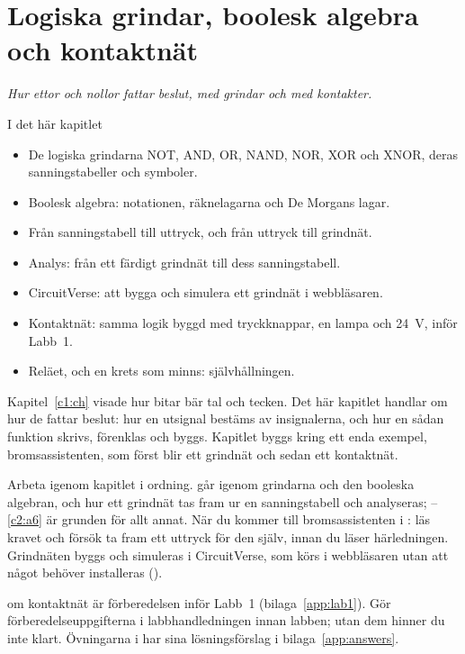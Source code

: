 
\chapter{Logiska grindar, boolesk algebra och kontaktnät}
\label{c2:ch}

{\large\itshape Hur ettor och nollor fattar beslut, med grindar och med kontakter.\par}

\begin{chapterbox}{I det här kapitlet}
\begin{itemize}
  \item De logiska grindarna NOT, AND, OR, NAND, NOR, XOR och XNOR, deras sanningstabeller och
    symboler.
  \item Boolesk algebra: notationen, räknelagarna och De Morgans lagar.
  \item Från sanningstabell till uttryck, och från uttryck till grindnät.
  \item Analys: från ett färdigt grindnät till dess sanningstabell.
  \item CircuitVerse: att bygga och simulera ett grindnät i webbläsaren.
  \item Kontaktnät: samma logik byggd med tryckknappar, en lampa och 24~V, inför Labb~1.
  \item Reläet, och en krets som minns: självhållningen.
\end{itemize}
\end{chapterbox}

Kapitel~\ref{c1:ch} visade hur bitar bär tal och tecken. Det här kapitlet handlar om hur de fattar
beslut: hur en utsignal bestäms av insignalerna, och hur en sådan funktion skrivs, förenklas och
byggs. Kapitlet byggs kring ett enda exempel, bromsassistenten, som först blir ett grindnät och
sedan ett kontaktnät.

Arbeta igenom kapitlet i ordning.  går igenom grindarna och den booleska
algebran, och hur ett grindnät tas fram ur en sanningstabell och analyseras;
--\ref{c2:a6} är grunden för allt annat. När du kommer till bromsassistenten i
: läs kravet och försök ta fram ett uttryck för den själv, innan du läser
härledningen. Grindnäten byggs och simuleras i CircuitVerse, som körs i webbläsaren utan att något
behöver installeras ().

 om kontaktnät är förberedelsen inför Labb~1 (bilaga~\ref{app:lab1}). Gör
förberedelseuppgifterna i labbhandledningen innan labben; utan dem hinner du inte klart. Övningarna
i  har sina lösningsförslag i bilaga~\ref{app:answers}.





